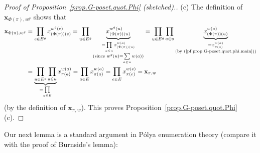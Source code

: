 \documentclass[12pt]{article}
\theoremstyle{plain}
\theoremstyle{definition}
\theoremstyle{remark}
\let\sumnonlimits\sum
\let\prodnonlimits\prod
\renewcommand{\sum}{\sumnonlimits\limits}
\renewcommand{\prod}{\prodnonlimits\limits}
\newcommand{\xx}{{\mathbf{x}}}
\begin{document}
\begin{proof}[Proof of Proposition~\ref{prop.G-poset.quot.Phi} (sketched).]
(c) 
The definition of $\xx_{\Phi\left(  \pi\right)  ,w^{g}}$ shows that
\begin{align*}
\xx_{\Phi\left(  \pi\right)  ,w^{g}}
&= \prod_{e\in E^{g}}
 x_{\left( \Phi\left(  \pi\right)  \right)  \left(  e\right)  }^{
    w^{g}\left(  e\right) }
= \prod_{u\in E^{g}}
 \underbrace{x_{\left(  \Phi\left(  \pi\right)  \right)
    \left(  u\right)  }^{w^{g}\left(  u\right)  }}_{
    \substack{=\prod_{a\in u}x_{\left(  \Phi\left(  \pi\right) 
    \right)  \left(  u\right)  }^{w\left( a\right)  }\\\text{(since }
    w^{g}\left(  u\right)  =\sum\limits_{a\in u}w\left(  a\right)
    \text{)}}}
= \prod_{u\in E^{g}} \prod_{a\in u}
  \underbrace{x_{\left(  \Phi\left(  \pi\right)  \right) 
    \left(  u\right) }^{w\left(  a\right)  }}_{
    \substack{=x_{\pi\left(  a\right)  }^{w\left( a\right)  }\\
    \text{(by (\ref{pf.prop.G-poset.quot.phi.main}))}}}\\
&= \underbrace{\prod_{u\in E^{g}}\prod_{a\in u}}_{=\prod_{a\in E}}
  x_{\pi\left(  a\right)  }^{w\left(  a\right)  }
=\prod_{a\in E}x_{\pi\left( a\right)  }^{w\left(  a\right)  }
=\prod_{e\in E}x_{\pi\left(  e\right) }^{w\left(  e\right)  }
=\xx_{\pi,w}%
\end{align*}
(by the definition of $\xx_{\pi,w}$). This proves
Proposition~\ref{prop.G-poset.quot.Phi} (c).
\end{proof}

Our next lemma is a standard argument in P\'olya enumeration theory (compare
it with the proof of Burnside's lemma):
\end{document}
